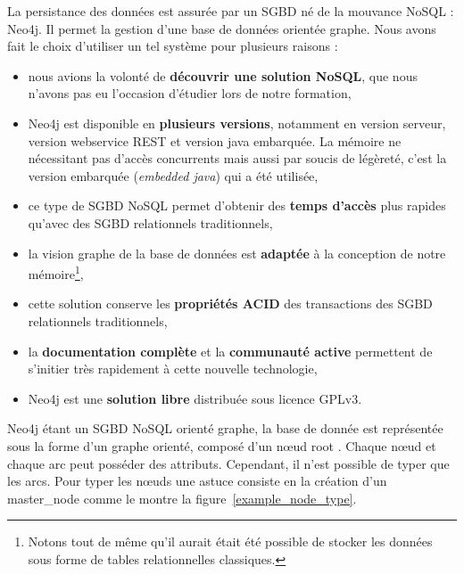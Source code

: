 La persistance des données est assurée par un \gls{SGBD} né de la mouvance \gls{NoSQL} : Neo4j. Il permet la gestion d'une base de données orientée graphe. Nous avons fait le choix d'utiliser un tel système pour plusieurs raisons :

\begin{itemize}
\item nous avions la volonté de \textbf{découvrir une solution \gls{NoSQL}}, que nous n'avons pas eu l'occasion d'étudier lors de notre formation,

\item Neo4j est disponible en \textbf{plusieurs versions}, notamment en version serveur, version webservice REST et version java embarquée. La mémoire ne nécessitant pas d'accès concurrents mais aussi par soucis de légèreté, c'est la version embarquée (\emph{embedded java}) qui a été utilisée,

\item ce type de \gls{SGBD} \gls{NoSQL} permet d'obtenir des \textbf{temps d'accès} plus rapides qu'avec des \gls{SGBD} relationnels traditionnels,

\item la vision graphe de la base de données est \textbf{adaptée} à la conception de notre mémoire\footnote{Notons tout de même qu'il aurait était été possible de stocker les données sous forme de tables relationnelles classiques.},

\item cette solution conserve les \textbf{propriétés \gls{ACID}} des transactions des \gls{SGBD} relationnels traditionnels,

\item la \textbf{documentation complète} et la \textbf{communauté active} permettent de s'initier très rapidement à cette nouvelle technologie,

\item Neo4j est une \textbf{solution libre} distribuée sous licence \gls{GPLv3}.
\end{itemize}

Neo4j étant un \gls{SGBD} \gls{NoSQL} orienté graphe, la base de donnée est représentée sous la forme d'un graphe orienté, composé d'un nœud \og root \fg{}. Chaque nœud et chaque arc peut posséder des attributs. Cependant, il n'est possible de typer que les arcs. Pour typer les nœuds une astuce consiste en la création d'un \og master\_node \fg{} comme le montre la figure~\ref{example_node_type}.

